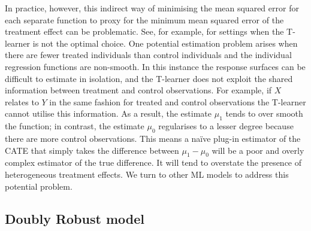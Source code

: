 \documentclass[12pt, a4paper]{article}
\begin{document}
%
In practice, however, this indirect way of minimising the mean squared error
for each separate function to proxy for the minimum mean squared error of the
treatment effect can be problematic. See, for example,
\cite{kunzel2019,kennedy2020} for settings when the T-learner is not the
optimal choice. One potential estimation problem arises when there are fewer
treated individuals than control individuals and the individual regression
functions are non-smooth. In this instance the response surfaces can be
difficult to estimate in isolation, and the T-learner does not exploit the
shared information between treatment and control observations. For example, if
$X$ relates to $Y$ in the same fashion for treated and control observations the
T-learner cannot utilise this information. As a result, the estimate $\mu_1$
tends to over smooth the function; in contrast, the estimate $\mu_0$
regularises to a lesser degree because there are more control observations.
This means a na\"ive plug-in estimator of the CATE that simply takes the
difference between $\mu_1 - \mu_0$ will be a poor and overly complex estimator
of the true difference. It will tend to overstate the presence of heterogeneous
treatment effects. We turn to other ML models to address this potential
problem.

\subsection{Doubly Robust model}
\end{document}
